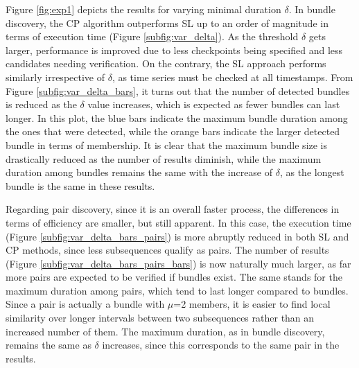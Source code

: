
Figure \ref{fig:exp1} depicts the results for varying minimal duration $\delta$. In bundle discovery, the CP algorithm outperforms SL up to an order of magnitude in terms of execution time (Figure \ref{subfig:var_delta}). As the threshold $\delta$ gets larger, performance is improved due to less checkpoints being specified and less candidates needing verification. On the contrary, the SL approach performs similarly irrespective of $\delta$, as time series must be checked at all timestamps. From Figure \ref{subfig:var_delta_bars}, it turns out that the number of detected bundles is reduced as the $\delta$ value increases, which is expected as fewer bundles can last longer. In this plot, the blue bars indicate the maximum bundle duration among the ones that were detected, while the orange bars indicate the larger detected bundle in terms of membership. It is clear that the maximum bundle size is drastically reduced as the number of results diminish, while the maximum duration among bundles remains the same with the increase of $\delta$, as the longest bundle is the same in these results.

Regarding pair discovery, since it is an overall faster process, the differences in terms of efficiency are smaller, but still apparent. In this case, the execution time (Figure \ref{subfig:var_delta_bars_pairs}) is more abruptly reduced in both SL and CP methods, since less subsequences qualify as pairs. The number of results (Figure \ref{subfig:var_delta_bars_pairs_bars}) is now naturally much larger, as far more pairs are expected to be verified if bundles exist. The same stands for the maximum duration among pairs, which tend to last longer compared to bundles. Since a pair is actually a bundle with $\mu$=2 members, it is easier to find local similarity over longer intervals between two subsequences rather than an increased number of them. The maximum duration, as in bundle discovery, remains the same as $\delta$ increases, since this corresponds to the same pair in the results. 

